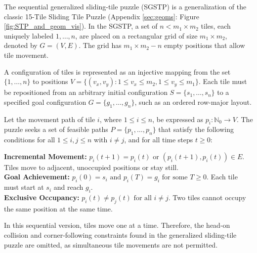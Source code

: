 The sequential generalized sliding-tile puzzle (SGSTP) is a generalization of the classic 15-Tile Sliding Tile Puzzle (Appendix \ref{sec:geoms}: Figure \ref{fig:STP_and_geom_vis}). In the SGSTP, a set of \( n < m_1 \times m_2 \) tiles, each uniquely labeled \( 1, \dots, n \), are placed on a rectangular grid of size \( m_1 \times m_2 \), denoted by \( G = (V, E) \). The grid has \( m_1 \times m_2 - n \) empty positions that allow tile movement.  

A configuration of tiles is represented as an injective mapping from the set \( \{1, \dots, n\} \) to positions \( V = \{(v_x, v_y) : 1 \leq v_x \leq m_2, 1 \leq v_y \leq m_1 \} \). Each tile must be repositioned from an arbitrary initial configuration \( S = \{s_1, \dots, s_n\} \) to a specified goal configuration \( G = \{g_1, \dots, g_n\} \), such as an ordered row-major layout.  

Let the movement path of tile \( i \), where \( 1 \leq i \leq n \), be expressed as \( p_i : \mathbb{N}_0 \to V \). The puzzle seeks a set of feasible paths \( P = \{p_1, \dots, p_n\} \) that satisfy the following conditions for all \( 1 \leq i, j \leq n \) with \( i \neq j \), and for all time steps \( t \geq 0 \):  

\textbf{Incremental Movement:} \( p_i(t+1) = p_i(t) \text{ or } (p_i(t+1), p_i(t)) \in E \).  
    Tiles move to adjacent, unoccupied positions or stay still.  \\
\textbf{Goal Achievement:} \( p_i(0) = s_i \text{ and } p_i(T) = g_i \text{ for some } T \geq 0 \). 
    Each tile must start at \( s_i \) and reach \( g_i \). \\ 
\textbf{Exclusive Occupancy:} \( p_i(t) \neq p_j(t) \text{ for all } i \neq j \). 
    Two tiles cannot occupy the same position at the same time.  

In this sequential version, tiles move one at a time. Therefore, the head-on collision and corner-following constraints found in the generalized sliding-tile puzzle are omitted, as simultaneous tile movements are not permitted.